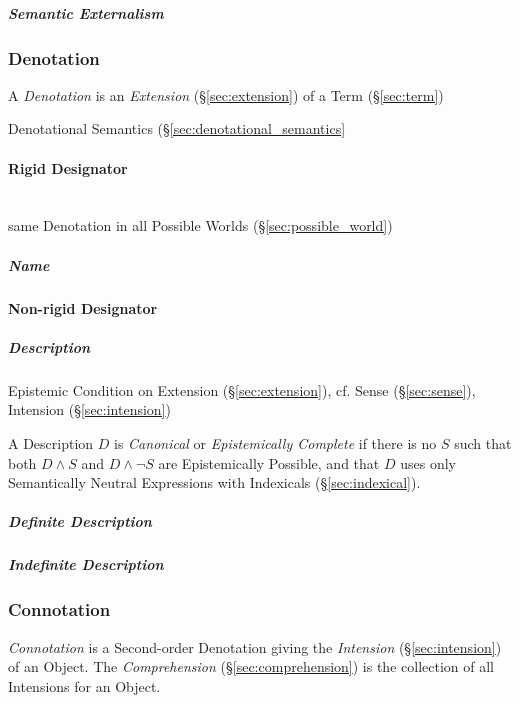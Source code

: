 \subparagraph{Semantic Externalism}\label{sec:semantic_externalism}



\subsubsection{Denotation}\label{sec:denotation}

A \emph{Denotation} is an \emph{Extension} (\S\ref{sec:extension}) of
a Term (\S\ref{sec:term})

Denotational Semantics (\S\ref{sec:denotational_semantics}



\paragraph{Rigid Designator}\label{sec:rigid_designator}
\hfill \\

same Denotation in all Possible Worlds (\S\ref{sec:possible_world})

\subparagraph{Name}\label{sec:name}



\paragraph{Non-rigid Designator}\label{sec:nonrigid_designator}

\subparagraph{Description}\label{sec:description}
\cite{chalmers02}

Epistemic Condition on Extension (\S\ref{sec:extension}), cf. Sense
(\S\ref{sec:sense}), Intension (\S\ref{sec:intension})

A Description $D$ is \emph{Canonical} or \emph{Epistemically Complete}
if there is no $S$ such that both $D \wedge S$ and $D \wedge \neg S$
are Epistemically Possible, and that $D$ uses only Semantically
Neutral Expressions with Indexicals (\S\ref{sec:indexical}).

\subparagraph{Definite Description}\label{sec:definite_description}

\subparagraph{Indefinite Description}\label{sec:indefinite_description}



\subsubsection{Connotation}\label{sec:connotation}

\emph{Connotation} is a Second-order Denotation giving the
\emph{Intension} (\S\ref{sec:intension}) of an Object. The
\emph{Comprehension} (\S\ref{sec:comprehension}) is the collection of
all Intensions for an Object.



